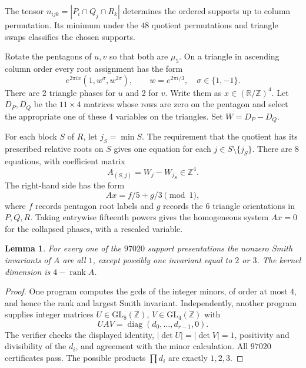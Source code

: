 \documentclass[11pt,a4paper]{article}
\newtheorem{lemma}[theorem]{Lemma}
\theoremstyle{plain}
\theoremstyle{definition}
\theoremstyle{plain}
\begin{document}
The tensor $n_{ijk}=|P_i\cap Q_j\cap R_k|$ determines the ordered supports up to column permutation. Its minimum under the $48$ quotient permutations and triangle swaps classifies the chosen supports.

\medskip
Rotate the pentagons of $u,v$ so that both are $\mu_5$. On a triangle in ascending column order every root assignment has the form
$$e^{2\pi i x}(1,w^{\sigma},w^{2\sigma}), \qquad w=e^{2\pi i/3},\quad \sigma\in\{1,-1\}.$$
There are 2 triangle phases for $u$ and 2 for $v$. Write them as $x\in(\mathbb R/\mathbb{Z})^4$. Let $D_P,D_Q$ be the $11\times4$ matrices whose rows are zero on the pentagon and select the appropriate one of these 4 variables on the triangles. Set $W=D_P-D_Q$.

For each block $S$ of $R$, let $j_S=\min S$. The requirement that the quotient has its prescribed relative roots on $S$ gives one equation for each $j\in S\setminus\{j_S\}$. There are 8 equations, with coefficient matrix
$$A_{(S,j)}=W_j-W_{j_S}\in\mathbb{Z}^4.$$
The right-hand side has the form
\[
Ax=f/5+g/3\pmod1,
\]
where $f$ records pentagon root labels and $g$ records the 6 triangle orientations in $P,Q,R$. Taking entrywise fifteenth powers gives the homogeneous system $Ax=0$ for the collapsed phases, with a rescaled variable.

\par\addvspace{\medskipamount}\noindent
\begin{minipage}{\linewidth}
\begin{lemma}\label{n11_noA_CCC:smith}
For every one of the $97020$ support presentations the nonzero Smith invariants of $A$ are all $1$, except possibly one invariant equal to $2$ or $3$. The kernel dimension is $4-\operatorname{rank}A$.
\end{lemma}
\end{minipage}
\par\addvspace{\medskipamount}

\begin{proof}
One program computes the gcds of the integer minors, of order at most $4$, and hence the rank and largest Smith invariant. Independently, another program supplies integer matrices $U\in\mathrm{GL}_8(\mathbb{Z})$, $V\in\mathrm{GL}_4(\mathbb{Z})$ with
$$UAV=\operatorname{diag}(d_0,\ldots,d_{r-1},0).$$
The verifier checks the displayed identity, $|\det U|=|\det V|=1$, positivity and divisibility of the $d_i$, and agreement with the minor calculation. All $97020$ certificates pass. The possible products $\prod d_i$ are exactly $1,2,3$.
\end{proof}
\end{document}
